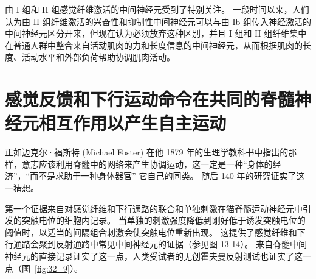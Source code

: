 由 I 组和 II 组感觉纤维激活的中间神经元受到了特别关注。
一段时间以来，人们认为由 II 组纤维激活的兴奋性和抑制性中间神经元可以与由 Ib 组传入神经激活的中间神经元区分开来，但现在认为必须放弃这种区别，并且 I 组和 II 组纤维集中在普通人群中整合来自活动肌肉的力和长度信息的中间神经元，从而根据肌肉的长度、活动水平和外部负荷帮助协调肌肉活动。



\section{感觉反馈和下行运动命令在共同的脊髓神经元相互作用以产生自主运动}

正如迈克尔·福斯特 (Michael Foster) 在他 1879 年的生理学教科书中指出的那样，意志应该利用脊髓中的网络来产生协调运动，这一定是一种“身体的经济”，“而不是求助于一种身体器官” 它自己的同类。
随后 140 年的研究证实了这一猜想。


第一个证据来自对感觉纤维和下行通路的联合和单独刺激在猫脊髓运动神经元中引发的突触电位的细胞内记录。
当单独的刺激强度降低到刚好低于诱发突触电位的阈值时，以适当的间隔组合刺激会使突触电位重新出现。
这提供了感觉纤维和下行通路会聚到反射通路中常见中间神经元的证据（参见图 13-14）。
来自脊髓中间神经元的直接记录证实了这一点，人类受试者的无创霍夫曼反射测试也证实了这一点（图~\ref{fig:32_9}）。


